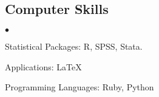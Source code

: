 \documentclass[margin,line]{res}
\newenvironment{list2}{
  \begin{list}{$\bullet$}{%
      \setlength{\itemsep}{0in}
      \setlength{\parsep}{0in} \setlength{\parskip}{0in}
      \setlength{\topsep}{0in} \setlength{\partopsep}{0in} 
      \setlength{\leftmargin}{0.2in}}}{\end{list}}
\begin{document}
\begin{resume}


\section{\sc Computer Skills} 
\begin{list2}
\item Statistical Packages:  R, SPSS, Stata.
\item Applications: \LaTeX
\item Programming Languages: Ruby, Python\\ 
\end{list2}



\end{resume}
\end{document}
